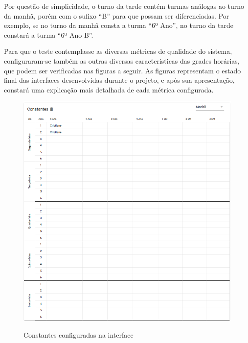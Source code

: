 

\newpage
Por questão de simplicidade, o turno da tarde contém turmas análogas ao turno da manhã, porém com o sufixo ``B'' para que possam ser diferenciadas. Por exemplo, se no turno da manhã consta a turma ``6º Ano'', no turno da tarde constará a turma ``6º Ano B''.

Para que o teste contemplasse as diversas métricas de qualidade do sistema, configuraram-se também as outras diversas características das grades horárias, que podem ser verificadas nas figuras a seguir. As figuras representam o estado final das interfaces desenvolvidas durante o projeto, e após sua apresentação, constará uma explicação mais detalhada de cada métrica configurada.

\begin{figure}[p]
	\centering
	\caption{Constantes configuradas na interface}
	\includegraphics[width=1\textwidth]{./dados/figuras/constantes_configuradas}
	\label{fig:constantes_configuradas}
\end{figure}

